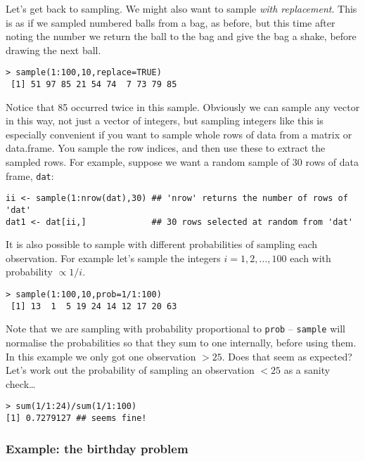 \documentclass[10pt] {article}
\theoremstyle{definition}
\begin{document}
Let's get back to sampling. We might also want to sample {\em with replacement}. This is as if we sampled numbered balls from a bag, as before, but this time after noting the number we return the ball to the bag and give the bag a shake, before drawing the next ball.
\begin{lstlisting}
> sample(1:100,10,replace=TRUE)
 [1] 51 97 85 21 54 74  7 73 79 85
\end{lstlisting}
Notice that 85 occurred twice in this sample. Obviously we can sample any vector in this way, not just a vector of integers, but sampling integers like this is especially convenient if you want to sample whole rows of data from a matrix or data.frame. You sample the row indices, and then use these to extract the sampled rows. For example, suppose we want a random sample of 30 rows of data frame, {\tt dat}:
\begin{lstlisting}
ii <- sample(1:nrow(dat),30) ## 'nrow' returns the number of rows of 'dat'
dat1 <- dat[ii,]             ## 30 rows selected at random from 'dat'
\end{lstlisting}
It is also possible to sample with different probabilities of sampling each observation. For example let's sample the integers $i=1,2,\ldots,100$ each with probability $\propto 1/i$.  
\begin{lstlisting}
> sample(1:100,10,prob=1/1:100)
 [1] 13  1  5 19 24 14 12 17 20 63 
\end{lstlisting}
Note that we are sampling with probability proportional to {\tt prob} -- {\tt sample} will normalise the probabilities so that they sum to one internally, before using them. In this example we only got one observation $>25$. Does that seem as expected? Let's work out the probability of sampling an observation $<25$ as a sanity check\ldots 
\begin{lstlisting}
> sum(1/1:24)/sum(1/1:100)
[1] 0.7279127 ## seems fine!
\end{lstlisting}

\subsubsection*{Example: the birthday problem}
\end{document}

